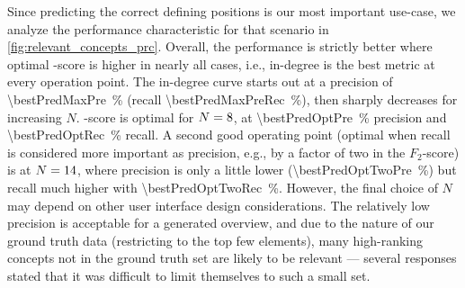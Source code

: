 
Since predicting the correct defining positions is our most important use-case,
we analyze the performance characteristic for that scenario in \autoref{fig:relevant_concepts_prc}.
Overall, 
the performance is strictly better where optimal \fOne-score is higher in nearly all cases,
i.e., in-degree is the best metric at every operation point.
The in-degree curve starts out at a precision of \SI[round-mode=places,round-precision=1]{\bestPredMaxPre}{\percent} (recall \SI[round-mode=places,round-precision=1]{\bestPredMaxPreRec}{\percent}), then sharply decreases for increasing $N$.
\fOne-score is optimal for $N=8$, at \SI[round-mode=places,round-precision=1]{\bestPredOptPre}{\percent} precision and \SI[round-mode=places,round-precision=1]{\bestPredOptRec}{\percent} recall.
A second good operating point
(optimal when recall is considered more important as precision, e.g., by a factor of two in the $F_2$-score)
is at $N=14$,
where precision is only a little lower (\SI[round-mode=places,round-precision=1]{\bestPredOptTwoPre}{\percent}) but recall much higher with \SI[round-mode=places,round-precision=1]{\bestPredOptTwoRec}{\percent}.
However, the final choice of $N$ may depend on other user interface design considerations.
The relatively low precision is acceptable for a generated overview,
and due to the nature of our ground truth data (restricting to the top few elements),
many high-ranking concepts not in the ground truth set are likely to be relevant ---
several responses stated that it was difficult to limit themselves to such a small set.
